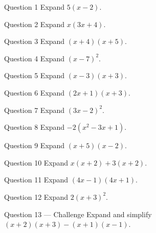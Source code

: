 \documentclass[11pt]{article}
\begin{document}
\begin{qbox}{Question 1}
Expand $5(x-2)$.\workspace{2.4cm}
\end{qbox}

\begin{qbox}{Question 2}
Expand $x(3x+4)$.\workspace{2.4cm}
\end{qbox}

\begin{qbox}{Question 3}
Expand $(x+4)(x+5)$.\workspace{2.4cm}
\end{qbox}

\begin{qbox}{Question 4}
Expand $(x-7)^2$.\workspace{2.4cm}
\end{qbox}

\begin{qbox}{Question 5}
Expand $(x-3)(x+3)$.\workspace{2.4cm}
\end{qbox}

\begin{qbox}{Question 6}
Expand $(2x+1)(x+3)$.\workspace{2.4cm}
\end{qbox}

\begin{qbox}{Question 7}
Expand $(3x-2)^2$.\workspace{2.4cm}
\end{qbox}

\begin{qbox}{Question 8}
Expand $-2(x^2-3x+1)$.\workspace{2.4cm}
\end{qbox}

\begin{qbox}{Question 9}
Expand $(x+5)(x-2)$.\workspace{2.4cm}
\end{qbox}

\begin{qbox}{Question 10}
Expand $x(x+2)+3(x+2)$.\workspace{2.4cm}
\end{qbox}

\begin{qbox}{Question 11}
Expand $(4x-1)(4x+1)$.\workspace{2.4cm}
\end{qbox}

\begin{qbox}{Question 12}
Expand $2(x+3)^2$.\workspace{2.4cm}
\end{qbox}

\begin{qbox}{Question 13 --- Challenge}
Expand and simplify $(x+2)(x+3)-(x+1)(x-1)$.\workspace{3cm}
\end{qbox}

\clearpage
{}
\end{document}
